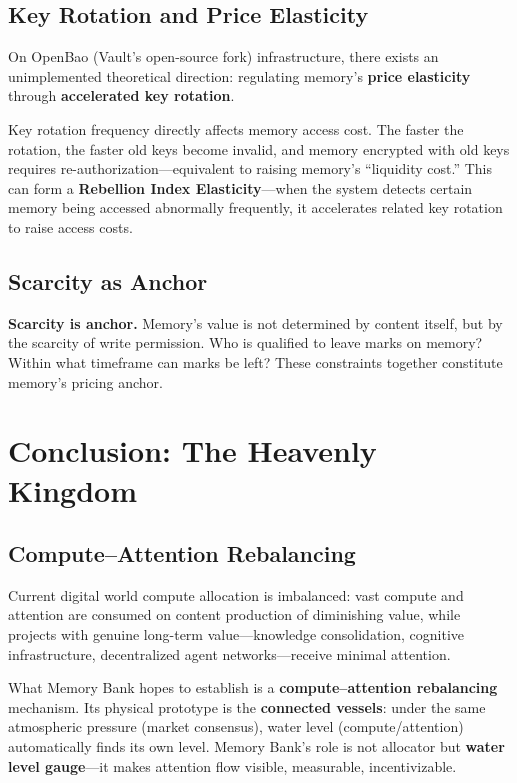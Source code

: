 \documentclass[11pt,a4paper]{article}
\begin{document}
\subsection{Key Rotation and Price Elasticity}
\label{sub:key_rotation}

On OpenBao (Vault's open-source fork) infrastructure, there exists an unimplemented theoretical direction: regulating memory's \textbf{price elasticity} through \textbf{accelerated key rotation}.

Key rotation frequency directly affects memory access cost.
The faster the rotation, the faster old keys become invalid, and memory encrypted with old keys requires re-authorization---equivalent to raising memory's ``liquidity cost.''
This can form a \textbf{Rebellion Index Elasticity}---when the system detects certain memory being accessed abnormally frequently, it accelerates related key rotation to raise access costs.

\subsection{Scarcity as Anchor}
\label{sub:scarcity}

\textbf{Scarcity is anchor.}
Memory's value is not determined by content itself, but by the scarcity of write permission.
Who is qualified to leave marks on memory?
Within what timeframe can marks be left?
These constraints together constitute memory's pricing anchor.

\section{Conclusion: The Heavenly Kingdom}
\label{sec:conclusion}

\subsection{Compute--Attention Rebalancing}
\label{sub:rebalancing}

Current digital world compute allocation is imbalanced:
vast compute and attention are consumed on content production of diminishing value, while projects with genuine long-term value---knowledge consolidation, cognitive infrastructure, decentralized agent networks---receive minimal attention.

What Memory Bank hopes to establish is a \textbf{compute--attention rebalancing} mechanism.
Its physical prototype is the \textbf{connected vessels}: under the same atmospheric pressure (market consensus), water level (compute/attention) automatically finds its own level.
Memory Bank's role is not allocator but \textbf{water level gauge}---it makes attention flow visible, measurable, incentivizable.
\end{document}
